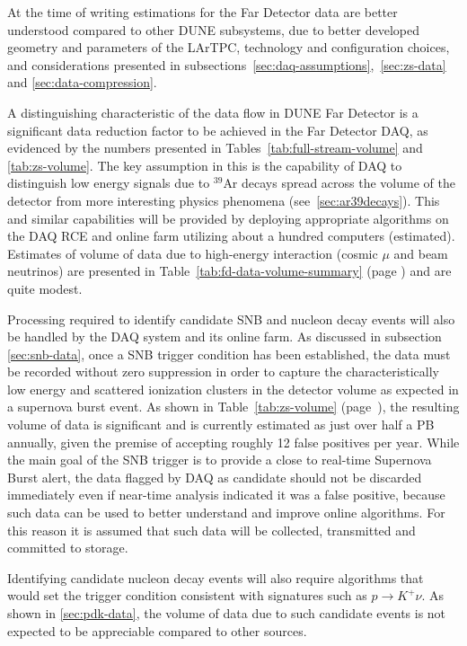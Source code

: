At the time of writing estimations for the Far Detector data are better understood compared to other DUNE subsystems,
due to better developed geometry and parameters of the LArTPC, technology and configuration choices, and considerations
presented in subsections~\ref{sec:daq-assumptions},~\ref{sec:zs-data} and \ref{sec:data-compression}.

A distinguishing characteristic of the data flow in DUNE Far Detector is a significant data reduction factor to be achieved
in the Far Detector DAQ, as evidenced by the numbers presented in Tables~\ref{tab:full-stream-volume} and \ref{tab:zs-volume}.
The key assumption in this is the capability of DAQ to distinguish low energy signals  due to $^{39}$Ar decays spread
across the volume of the detector from more interesting physics phenomena (see~\ref{sec:ar39decays}).
This and similar capabilities will be provided
by deploying appropriate algorithms on the DAQ RCE and online farm utilizing about a hundred computers (estimated).
Estimates of volume of data due to high-energy interaction (cosmic $\mu$ and beam neutrinos) are presented in
Table~\ref{tab:fd-data-volume-summary} (page \pageref{tab:fd-data-volume-summary}) and are quite modest.

Processing required to identify candidate SNB and nucleon decay events will also be handled by the DAQ system and its online farm.
As discussed in subsection \ref{sec:snb-data}, once a SNB trigger condition has been established, the data must
be recorded without zero suppression in order to capture the characteristically low energy and scattered ionization
clusters in the detector volume as expected in a supernova burst event. As shown in Table~\ref{tab:zs-volume} (page~\pageref{tab:zs-volume}),
the resulting volume of data is significant and is currently estimated as just over half a PB annually, given the premise of accepting roughly
12 false positives per year. While the main goal of the SNB trigger is to provide a close to real-time Supernova Burst alert, the data
flagged by DAQ as candidate should not be discarded immediately even if near-time analysis indicated it was a false positive,
because such data can be used to better understand and improve online algorithms. For this reason it is assumed that
such data will be collected, transmitted and committed to storage.

Identifying candidate nucleon decay events will also require algorithms that would set the trigger condition consistent
with signatures such as $p \rightarrow K^+\nu$. As shown in \ref{sec:pdk-data}, the volume of data due to such candidate
events is not expected to be appreciable compared to other sources.

